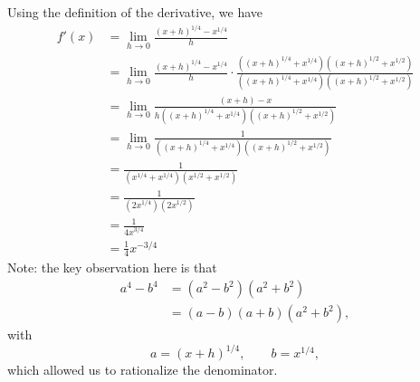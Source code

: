\documentclass{article}
\theoremstyle{definition}
\begin{document}
Using the definition of the derivative, we have
\begin{align*}
            f'(x)           &= \lim_{h\rightarrow 0}\frac{(x+h)^{1/4}-x^{1/4}}{h}   \\
                            &=  \lim_{h\rightarrow 0}\frac{(x+h)^{1/4}-x^{1/4}}{h}\cdot \frac{((x+h)^{1/4}+x^{1/4})((x+h)^{1/2}+x^{1/2})}{((x+h)^{1/4}+x^{1/4})((x+h)^{1/2}+x^{1/2})}\\
                            &=  \lim_{h\rightarrow 0}\frac{(x+h)-x}{h((x+h)^{1/4}+x^{1/4})((x+h)^{1/2}+x^{1/2})}    \\  
                            &=  \lim_{h\rightarrow 0}\frac{1}{((x+h)^{1/4}+x^{1/4})((x+h)^{1/2}+x^{1/2})}   \\
                            &= \frac{1}{(x^{1/4}+x^{1/4})(x^{1/2}+x^{1/2})} \\
                            &=  \frac{1}{(2x^{1/4})(2x^{1/2})}  \\
                            &=  \frac{1}{4x^{3/4}}  \\
                            &=  \frac{1}{4}x^{-3/4}
\end{align*}
Note: the key observation here is that
\begin{align*}
    a^4-b^4 &= (a^2-b^2)(a^2+b^2)   \\
        &= (a-b)(a+b)(a^2+b^2), 
\end{align*}
with 
\[
    a = (x+h)^{1/4}, \qquad b = x^{1/4},
\]
which allowed us to rationalize the denominator.
\end{document}
